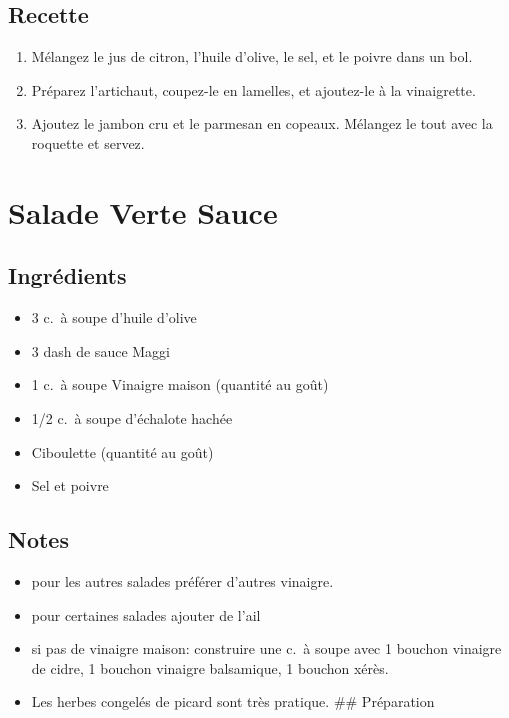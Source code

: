 \subsection{Recette}\label{recette-10}

\begin{enumerate}
\def\labelenumi{\arabic{enumi}.}

\item
  Mélangez le jus de citron, l'huile d'olive, le sel, et le poivre dans
  un bol.
\item
  Préparez l'artichaut, coupez-le en lamelles, et ajoutez-le à la
  vinaigrette.
\item
  Ajoutez le jambon cru et le parmesan en copeaux. Mélangez le tout avec
  la roquette et servez.
\end{enumerate}

\section{Salade Verte Sauce}\label{salade-verte-sauce}

\subsection{Ingrédients}\label{ingruxe9dients-16}

\begin{itemize}

\item
  3 c.~à soupe d'huile d'olive
\item
  3 dash de sauce Maggi
\item
  1 c.~à soupe Vinaigre maison (quantité au goût)
\item
  1/2 c.~à soupe d'échalote hachée
\item
  Ciboulette (quantité au goût)
\item
  Sel et poivre
\end{itemize}

\subsection{Notes}\label{notes-4}

\begin{itemize}

\item
  pour les autres salades préférer d'autres vinaigre.
\item
  pour certaines salades ajouter de l'ail
\item
  si pas de vinaigre maison: construire une c.~à soupe avec 1 bouchon
  vinaigre de cidre, 1 bouchon vinaigre balsamique, 1 bouchon xérès.
\item
  Les herbes congelés de picard sont très pratique. \#\# Préparation
\end{itemize}

